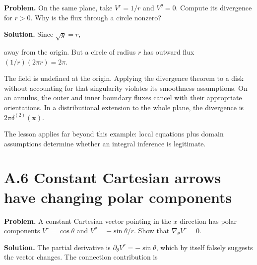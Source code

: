 \documentclass[
  11pt,
  letterpaper,
  oneside,
  openany]{scrbook}
\begin{document}
\textbf{Problem.} On the same plane, take \(V^r=1/r\) and
\(V^\theta=0\). Compute its divergence for \(r>0\). Why is the flux
through a circle nonzero?

\textbf{Solution.} Since \(\sqrt{g}=r\),

\begin{center}
\begingroup
{}
\ifdim\wd\grmathbox>\linewidth
\resizebox{\linewidth}{!}{\usebox{\grmathbox}}
\else\usebox{\grmathbox}\fi
\endgroup
\end{center}

away from the origin. But a circle of radius \(r\) has outward flux
\((1/r)(2\pi r)=2\pi\).

The field is undefined at the origin. Applying the divergence theorem to
a disk without accounting for that singularity violates its smoothness
assumptions. On an annulus, the outer and inner boundary fluxes cancel
with their appropriate orientations. In a distributional extension to
the whole plane, the divergence is \(2\pi\delta^{(2)}(\mathbf{x})\).

The lesson applies far beyond this example: local equations plus domain
assumptions determine whether an integral inference is legitimate.

\hypertarget{a.6-constant-cartesian-arrows-have-changing-polar-components}{%
\section{A.6 Constant Cartesian arrows have changing polar
components}\label{a.6-constant-cartesian-arrows-have-changing-polar-components}}

\textbf{Problem.} A constant Cartesian vector pointing in the \(x\)
direction has polar components \(V^r=\cos\theta\) and
\(V^\theta=-\sin\theta/r\). Show that \(\nabla_\theta V^r=0\).

\textbf{Solution.} The partial derivative is
\(\partial_\theta V^r=-\sin\theta\), which by itself falsely suggests
the vector changes. The connection contribution is

\begin{center}
\begingroup
{}
\ifdim\wd\grmathbox>\linewidth
\resizebox{\linewidth}{!}{\usebox{\grmathbox}}
\else\usebox{\grmathbox}\fi
\endgroup
\end{center}
\end{document}
